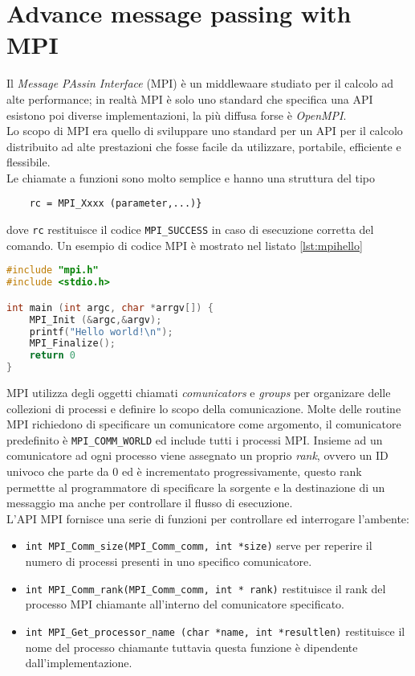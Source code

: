 \section{Advance message passing with MPI}\label{capitolo5}
Il \emph{Message PAssin Interface} (MPI) è un middlewaare studiato per il calcolo ad alte performance; in realtà MPI è solo uno standard che specifica una API esistono poi diverse implementazioni, la più diffusa forse è \emph{OpenMPI}.\\
Lo scopo di MPI era quello di sviluppare uno standard per un API per il calcolo distribuito ad alte prestazioni che fosse facile da utilizzare, portabile, efficiente e flessibile.\\
Le chiamate a funzioni sono molto semplice e hanno una struttura del tipo
\begin{verbatim}
	rc = MPI_Xxxx (parameter,...)}
\end{verbatim}
dove \texttt{rc} restituisce il codice \texttt{MPI\_SUCCESS} in caso di esecuzione corretta del comando. Un esempio di codice MPI è mostrato nel listato \ref{lst:mpihello}
\begin{lstlisting}[language=C,caption={Hello World con MPI},label=lst:mpihello]
#include "mpi.h"
#include <stdio.h>

int main (int argc, char *arrgv[]) {
	MPI_Init (&argc,&argv);
	printf("Hello world!\n");
	MPI_Finalize();
	return 0
}
\end{lstlisting}
MPI utilizza degli oggetti chiamati \emph{comunicators} e \emph{groups} per organizare delle collezioni di processi e definire lo scopo della comunicazione. Molte delle routine MPI richiedono di specificare un comunicatore come argomento, il comunicatore predefinito è \texttt{MPI\_COMM\_WORLD} ed include tutti i processi MPI. Insieme ad un comunicatore ad ogni processo viene assegnato un proprio \emph{rank}, ovvero un ID univoco che parte da $ 0 $ ed è incrementato progressivamente, questo rank permettte al programmatore di specificare la sorgente e la destinazione di un messaggio ma anche per controllare il flusso di esecuzione.\\
L'API MPI fornisce una serie di funzioni per controllare ed interrogare l'ambente:
\begin{itemize}
	\item \texttt{int MPI\_Comm\_size(MPI\_Comm\_comm, int *size)} serve per reperire il numero di processi presenti in uno specifico comunicatore.
	\item \texttt{int MPI\_Comm\_rank(MPI\_Comm\_comm, int * rank)} restituisce il rank del processo MPI chiamante all'interno del comunicatore specificato.
	\item \texttt{int MPI\_Get\_processor\_name (char *name, int *resultlen)} restituisce il nome del processo chiamante tuttavia questa funzione è dipendente dall'implementazione.
\end{itemize}
